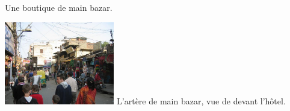 \begin{multicols}{2}
Une boutique de main bazar.

\hspace*{-0.65cm}
\includegraphics[width=4.8cm]{articles/Arrivee-en-inde/rue.jpg}
L'artère de main bazar, vue de devant l'hôtel.

\end{multicols}


